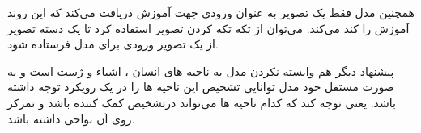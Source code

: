 همچنین مدل فقط یک تصویر به عنوان ورودی جهت آموزش دریافت می‌کند که این روند آموزش را کند می‌کند. می‌توان از تکه تکه کردن تصویر استفاده کرد تا یک دسته تصویر از یک تصویر ورودی برای مدل فرستاده شود.

پیشنهاد دیگر هم وابسته نکردن مدل به ناحیه های انسان ، اشیاء و ژست است و به صورت مستقل خود مدل توانایی تشخیص این ناحیه ها را در یک رویکرد توجه داشته باشد. یعنی توجه کند که کدام ناحیه ها می‌تواند درتشخیص کمک کننده باشد و تمرکز روی آن نواحی داشته باشد.



